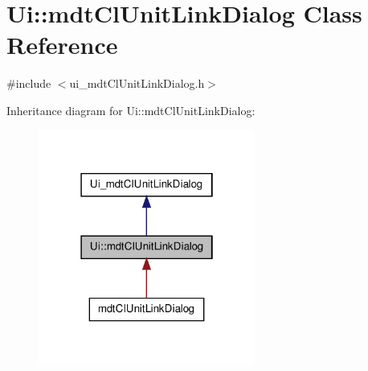 \hypertarget{class_ui_1_1mdt_cl_unit_link_dialog}{\section{Ui\-:\-:mdt\-Cl\-Unit\-Link\-Dialog Class Reference}
\label{class_ui_1_1mdt_cl_unit_link_dialog}
}


{\ttfamily \#include $<$ui\-\_\-mdt\-Cl\-Unit\-Link\-Dialog.\-h$>$}



Inheritance diagram for Ui\-:\-:mdt\-Cl\-Unit\-Link\-Dialog\-:\nopagebreak
\begin{figure}[H]
\begin{center}
\leavevmode
\includegraphics[width=202pt]{class_ui_1_1mdt_cl_unit_link_dialog__inherit__graph}
\end{center}
\end{figure}


